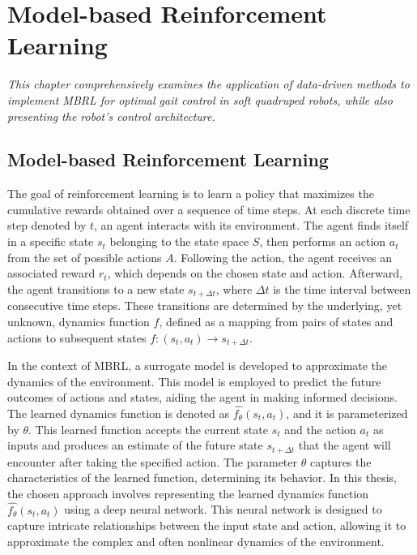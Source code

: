 \chapter{Model-based Reinforcement Learning}
\label{chap4}
\textit{This chapter comprehensively examines the application of data-driven methods to implement \ac{MBRL} for optimal gait control in soft quadruped robots, while also presenting the robot's control architecture.}

\section{Model-based Reinforcement Learning}
The goal of reinforcement learning is to learn a policy that maximizes the cumulative rewards obtained over a sequence of time steps. At each discrete time step denoted by $t$, an agent interacts with its environment. The agent finds itself in a specific state $s_t$ belonging to the state space $S$, then performs an action $a_t$ from the set of possible actions $A$. Following the action, the agent receives an associated reward $r_t$, which depends on the chosen state and action. Afterward, the agent transitions to a new state $s_{t+\Delta t}$, where $\Delta t$ is the time interval between consecutive time steps. These transitions are determined by the underlying, yet unknown, dynamics function $f$, defined as a mapping from pairs of states and actions to subsequent states $f: (s_t, a_t) \rightarrow s_{t+\Delta t}$. 

In the context of \ac{MBRL}, a surrogate model is developed to approximate the dynamics of the environment. This model is employed to predict the future outcomes of actions and states, aiding the agent in making informed decisions. The learned dynamics function is denoted as $\hat{f_\theta}(s_t, a_t)$, and it is parameterized by $\theta$. This learned function accepts the current state $s_t$ and the action $a_t$ as inputs and produces an estimate of the future state $s_{t+\Delta t}$ that the agent will encounter after taking the specified action. The parameter $\theta$ captures the characteristics of the learned function, determining its behavior. In this thesis, the chosen approach involves representing the learned dynamics function $\hat{f_\theta}(s_t, a_t)$ using a deep neural network. This neural network is designed to capture intricate relationships between the input state and action, allowing it to approximate the complex and often nonlinear dynamics of the environment. 

